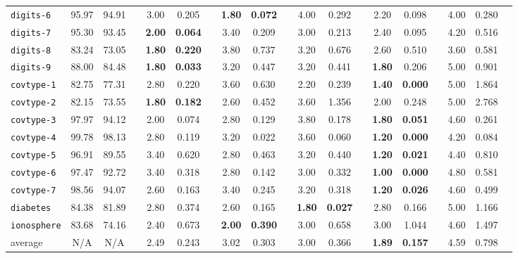 \begin{subappendices}
\begin{landscape}
\begin{table}[!h]
{\begin{tabular}{lcccccccccccccccccc}
\texttt{digits-6} & 95.97 & 94.91 & & 3.00 & 0.205 & & \textbf{1.80} & \textbf{0.072} & & {\color{gray}4.00} & {\color{gray}0.292} & & 2.20 & 0.098 & & {\color{gray}4.00} & 0.280\\
\texttt{digits-7} & 95.30 & 93.45 & & \textbf{2.00} & \textbf{0.064} & & 3.40 & 0.209 & & 3.00 & 0.213 & & 2.40 & 0.095 & & {\color{gray}4.20} & {\color{gray}0.516}\\
\texttt{digits-8} & 83.24 & 73.05 & & \textbf{1.80} & \textbf{0.220} & & {\color{gray}3.80} & {\color{gray}0.737} & & 3.20 & 0.676 & & 2.60 & 0.510 & & 3.60 & 0.581\\
\texttt{digits-9} & 88.00 & 84.48 & & \textbf{1.80} & \textbf{0.033} & & 3.20 & 0.447 & & 3.20 & 0.441 & & \textbf{1.80} & 0.206 & & {\color{gray}5.00} & {\color{gray}0.901}\\
\texttt{covtype-1} & 82.75 & 77.31 & & 2.80 & 0.220 & & 3.60 & 0.630 & & 2.20 & 0.239 & & \textbf{1.40} & \textbf{0.000} & & {\color{gray}5.00} & {\color{gray}1.864}\\
\texttt{covtype-2} & 82.15 & 73.55 & & \textbf{1.80} & \textbf{0.182} & & 2.60 & 0.452 & & 3.60 & 1.356 & & 2.00 & 0.248 & & {\color{gray}5.00} & {\color{gray}2.768}\\
\texttt{covtype-3} & 97.97 & 94.12 & & 2.00 & 0.074 & & 2.80 & 0.129 & & 3.80 & 0.178 & & \textbf{1.80} & \textbf{0.051} & & {\color{gray}4.60} & {\color{gray}0.261}\\
\texttt{covtype-4} & 99.78 & 98.13 & & 2.80 & {\color{gray}0.119} & & 3.20 & 0.022 & & 3.60 & 0.060 & & \textbf{1.20} & \textbf{0.000} & & {\color{gray}4.20} & 0.084\\
\texttt{covtype-5} & 96.91 & 89.55 & & 3.40 & 0.620 & & 2.80 & 0.463 & & 3.20 & 0.440 & & \textbf{1.20} & \textbf{0.021} & & {\color{gray}4.40} & {\color{gray}0.810}\\
\texttt{covtype-6} & 97.47 & 92.72 & & 3.40 & 0.318 & & 2.80 & 0.142 & & 3.00 & 0.332 & & \textbf{1.00} & \textbf{0.000} & & {\color{gray}4.80} & {\color{gray}0.581}\\
\texttt{covtype-7} & 98.56 & 94.07 & & 2.60 & 0.163 & & 3.40 & 0.245 & & 3.20 & 0.318 & & \textbf{1.20} & \textbf{0.026} & & {\color{gray}4.60} & {\color{gray}0.499}\\
\texttt{diabetes} & 84.38 & 81.89 & & 2.80 & 0.374 & & 2.60 & 0.165 & & \textbf{1.80} & \textbf{0.027} & & 2.80 & 0.166 & & {\color{gray}5.00} & {\color{gray}1.166}\\
\texttt{ionosphere} & 83.68 & 74.16 & & 2.40 & 0.673 & & \textbf{2.00} & \textbf{0.390} & & 3.00 & 0.658 & & 3.00 & 1.044 & & {\color{gray}4.60} & {\color{gray}1.497}\\
\midrule
average & N/A & N/A & & 2.49 & 0.243 & & 3.02 & 0.303 & & 3.00 & 0.366 & & \textbf{1.89} & \textbf{0.157} & & {\color{gray}4.59} & {\color{gray}0.798} \\
\bottomrule
\end{tabular}%
}
\end{table}
\end{landscape}

\end{subappendices}

